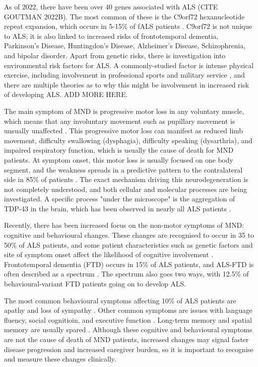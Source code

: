 As of 2022, there have been over 40 genes associated with ALS (CITE GOUTMAN 2022B). The most common of these is the C9orf72 hexanucleotide repeat expansion, which occurs in 5-15\% of fALS patients \cite{vanesAmyotrophicLateralSclerosis2017}. C9orf72 is not unique to ALS; it is also linked to increased risks of frontotemporal dementia, Parkinson's Disease, Huntingdon's Disease, Alzheimer's Disease, Schizophrenia, and bipolar disorder.
Apart from genetic risks, there is investigation into environmental risk factors for ALS. A commonly-studied factor is intense physical exercise, including involvement in professional sports and military service \cite{mckayMilitaryServiceRelated2021, lacortePhysicalActivityPhysical2016}, and there are multiple theories as to why this might be involvement in increased risk of developing ALS. ADD MORE HERE.

The main symptom of MND is progressive motor loss in any voluntary muscle, which means that any involuntary movement such as pupillary movement is unsually unaffected \cite{vanesAmyotrophicLateralSclerosis2017}. This progressive motor loss can manifest as reduced limb movement, difficulty swallowing (dysphagia), difficulty speaking (dysarthria), and impaired respiratory function, which is usually the cause of death for MND patients. At symptom onset, this motor loss is usually focused on one body segment, and the weakness spreads in a predictive pattern to the contralateral side in 85\% of patients \cite{walhoutPatternsSymptomDevelopment2018}. The exact mechanism driving this neurodegeneration is not completely understood, and both cellular and molecular processes are being investigated. A specific process "under the microscope" is the aggregation of TDP-43 in the brain, which has been observed in nearly all ALS patients \cite{blokhuisProteinAggregationAmyotrophic2013}.

Recently, there has been increased focus on the non-motor symptoms of MND: cognitive and behavioural changes. These changes are recognised to occur in 35 to 50\% of ALS patients, and some patient characteristics such as genetic factors and site of symptom onset affect the likelihood of cognitive involvement \cite{yangRiskFactorsCognitive2021, chioALSPhenotypeInfluenced2020}. Frontotemporal dementia (FTD) occurs in 15\% of ALS patients, and ALS-FTD is often described as a spectrum \cite{strongAmyotrophicLateralSclerosis2017}. The spectrum also goes two ways, with 12.5\% of behavioural-variant FTD patients going on to develop ALS.

The most common behavioural symptoms affecting 10\% of ALS patients are apathy and loss of sympathy \cite{abrahamsScreeningCognitionBehaviour2014}. Other common symptoms are issues with language fluency, social cognitioin, and executive function \cite{beeldmanCognitiveProfileALS2016}. Long-term memory and spatial memory are usually spared \cite{crockfordALSspecificCognitiveBehavior2018}. Although these cognitive and behavioural symptoms are not the cause of death of MND patients, increased changes may signal faster disease progression and increased caregiver burden, so it is important to recognise and measure these changes clinically.


